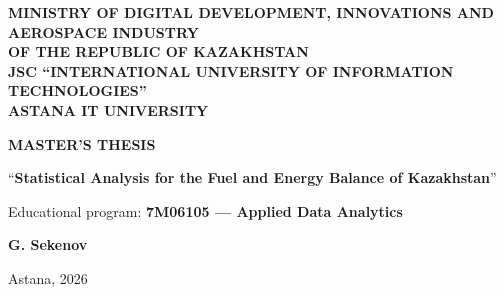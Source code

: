 \begin{titlepage}
\thispagestyle{empty}
\begin{center}

\textbf{MINISTRY OF DIGITAL DEVELOPMENT, INNOVATIONS AND}\\
\textbf{AEROSPACE INDUSTRY}\\
\textbf{OF THE REPUBLIC OF KAZAKHSTAN}\\[6pt]
\textbf{JSC ``INTERNATIONAL UNIVERSITY OF INFORMATION TECHNOLOGIES''}\\
\textbf{ASTANA IT UNIVERSITY}

\vfill

\textbf{MASTER'S THESIS}

\vspace{1.5cm}

``\textbf{Statistical Analysis for the Fuel and Energy Balance of Kazakhstan}''

\vspace{1cm}

Educational program: \textbf{7M06105 --- Applied Data Analytics}

\vfill

\textbf{G. Sekenov}

\vfill

Astana, 2026

\end{center}
\end{titlepage}

